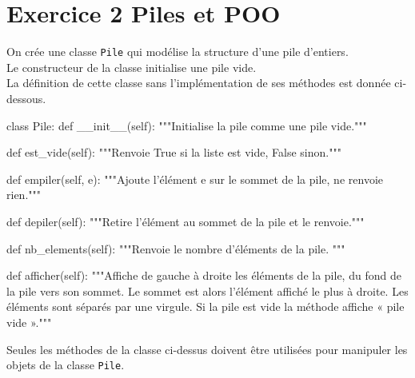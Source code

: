 \documentclass[a4paper,12pt,french]{book}
\begin{document}
    \section*{Exercice 2 \small{\hfill Piles et POO}}
    On crée une classe \texttt{Pile} qui modélise la structure d'une pile d'entiers.\\
    Le constructeur de la classe initialise une pile vide.\\
    La définition de cette classe sans l’implémentation de ses méthodes est donnée ci-dessous.
    \begin{pythoncode}
class Pile:
    def __init__(self):
        """Initialise la pile comme une pile vide."""

    def est_vide(self):
        """Renvoie True si la liste est vide, False sinon."""

    def empiler(self, e):
        """Ajoute l'élément e sur le sommet de la pile,
        ne renvoie rien."""

    def depiler(self):
        """Retire l’élément au sommet de la pile et le renvoie."""

    def nb_elements(self):
        """Renvoie le nombre d'éléments de la pile. """

    def afficher(self):
        """Affiche de gauche à droite les éléments de la pile, du fond
        de la pile vers son sommet. Le sommet est alors l’élément
        affiché le plus à droite. Les éléments sont séparés par une
        virgule. Si la pile est vide la méthode affiche « pile
        vide »."""
    \end{pythoncode}
    Seules les méthodes de la classe ci-dessus doivent être utilisées pour manipuler les objets de la classe
    \texttt{Pile}.
\end{document}
